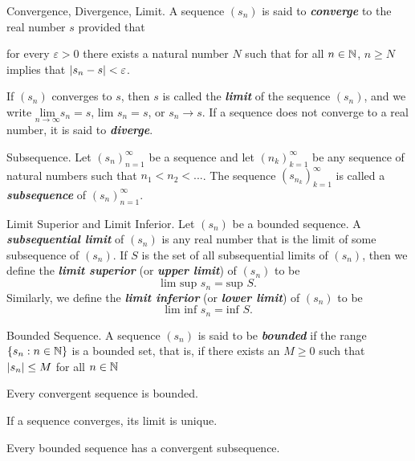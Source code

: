 \documentclass[12pt]{article}
\begin{document}
\begin{definition}{Convergence, Divergence, Limit.}
  A sequence $(s_n)$ is said to \textbf{\textit{converge}} to the real number
  $s$ provided that
  \begin{center}
    for every $\varepsilon > 0$ there exists a natural number $N$ such that for
    all $n \in \mathbb{N}$, $n \ge N$ implies that $\left|s_n - s\right| < \varepsilon$.
  \end{center}
  If $(s_n)$ converges to $s$, then $s$ is called the \textbf{\textit{limit}}
  of the sequence $(s_n)$, and we write $\underset{n\rightarrow\infty}{\text{lim}} s_n = s$,
  lim $s_n = s$, or $s_n \rightarrow s$. If a sequence does not converge to a real
  number, it is said to \textbf{\textit{diverge}}.
\end{definition}

\begin{definition}{Subsequence.}
Let $(s_n)_{n=1}^\infty$ be a sequence and let $(n_k)_{k=1}^{\infty}$ be any sequence
of natural numbers such that $n_1 < n_2 < ...$. The sequence
$(s_{n_k})_{k=1}^{\infty}$ is called a \textit{\textbf{subsequence}} of
$(s_n)_{n=1}^\infty$.
\end{definition}

\begin{definition}{Limit Superior and Limit Inferior.}
  Let $(s_n)$ be a bounded sequence. A \textbf{\textit{subsequential limit}}
  of $(s_n)$ is any real number that is the limit of some subsequence of
  $(s_n)$. If $S$ is the set of all subsequential limits of $(s_n)$, then we
  define the \textbf{\textit{limit superior}} (or \textbf{\textit{upper
  limit}}) of $(s_n)$ to be $$\text{lim sup } s_n = \text{sup } S.$$
  Similarly, we define the \textit{\textbf{limit inferior}} (or
  \textit{\textbf{lower limit}}) of $(s_n)$ to be $$\text{lim inf } s_n =
  \text{inf } S.$$
\end{definition}

\begin{definition}{Bounded Sequence.}
  A sequence $(s_n)$ is said to be \textit{\textbf{bounded}} if the range $\{
  s_n : n \in \mathbb{N} \}$ is a bounded set, that is, if there exists an $M \ge
  0$ such that $\left|s_n\right| \le M$ for all $n \in \mathbb{N}$

  Every convergent sequence is bounded.

  If a sequence converges, its limit is unique.

  Every bounded sequence has a convergent subsequence.
\end{definition}
\end{document}
